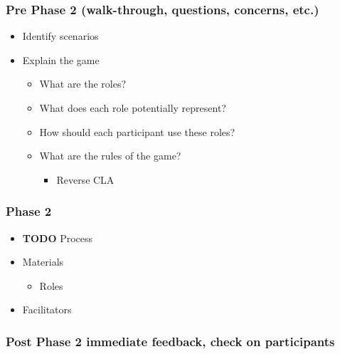 \documentclass[12pt]{article}
\begin{document}
\subsubsection*{Pre Phase 2 (walk-through, questions, concerns, etc.)}
\label{sec:org4ed16cb}
\begin{itemize}
\item Identify scenarios
\label{sec:org8843022}
\item Explain the game
\label{sec:org882fb3b}
\begin{itemize}
\item What are the roles?
\label{sec:org3006633}
\item What does each role potentially represent?
\label{sec:org66d1e32}
\item How should each participant use these roles?
\label{sec:org46e7899}
\item What are the rules of the game?
\label{sec:org784f150}
\begin{itemize}
\item Reverse CLA
\label{sec:org725b3fa}
\end{itemize}
\end{itemize}
\end{itemize}
\subsubsection*{Phase 2}
\label{sec:org120bae6}
\begin{itemize}
\item {\bfseries\sffamily TODO} Process
\label{sec:org1836b33}
\item Materials
\label{sec:org07d90f4}
\begin{itemize}
\item Roles
\label{sec:org05bb296}
\end{itemize}
\item Facilitators
\label{sec:orga1ea6a5}
\end{itemize}
\subsubsection*{Post Phase 2 immediate feedback, check on participants}
\label{sec:orgb8d4228}
\end{document}

